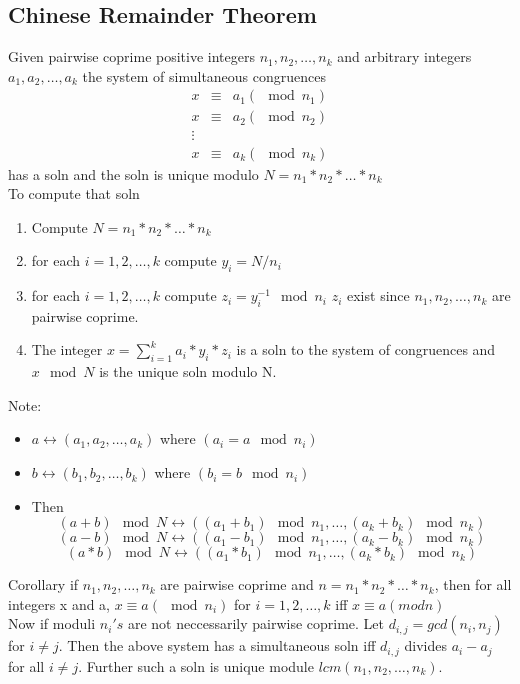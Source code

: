 \documentclass[8pt, a4paper, oneside, twocolumn]{extarticle}
\begin{document}
\subsection{Chinese Remainder Theorem}
Given pairwise coprime positive integers $n_1, n_2, \dots, n_k$ and arbitrary integers $a_1, a_2, \dots, a_k$ the system of simultaneous congruences \begin{eqnarray}
x & \equiv & a_1 (\mod n_1)\\
x & \equiv & a_2 (\mod n_2)\\
\vdots\\
x & \equiv & a_k (\mod n_k)
\end{eqnarray}
has a soln and the soln is unique modulo $N = n_1 * n_2 *\dots*n_k$
\\To compute that soln
\begin{enumerate}
    \item Compute $N = n_1 * n_2 * \dots * n_k$
    \item for each $i = 1, 2, \dots, k$ compute $y_i = N/n_i$
    \item for each $i = 1, 2, \dots, k$ compute $z_i = y_{i}^{-1} \mod n_i$ $z_i$ exist since $n_1, n_2, \dots, n_k$ are pairwise coprime.
    \item The integer $x = \sum_{i = 1}^k a_i * y_i * z_i$ is a soln to the system of congruences and $x \mod N$ is the unique soln modulo N.
\end{enumerate}
Note:
\begin{itemize}
    \item $a \leftrightarrow (a_1, a_2, \dots, a_k)$ where $(a_i = a \mod n_i)$
    \item $b \leftrightarrow (b_1, b_2, \dots, b_k)$ where $(b_i = b \mod n_i)$
    \item Then
    $$(a+b) \mod N \leftrightarrow ((a_1 + b_1) \mod n_1, \dots, (a_k + b_k) \mod n_k)$$ 
    $$(a-b) \mod N \leftrightarrow ((a_1 - b_1) \mod n_1, \dots, (a_k - b_k) \mod n_k)$$
    $$(a*b) \mod N \leftrightarrow ((a_1 * b_1) \mod n_1, \dots, (a_k * b_k) \mod n_k)$$
\end{itemize}
Corollary if $n_1, n_2, \dots, n_k$ are pairwise coprime and $n = n_1*n_2*\dots * n_k$, then for all integers x and a, $x \equiv a (\mod n_i)$ for $i = 1, 2, \dots, k$ iff $x \equiv a (mod n)$
\\Now if moduli $n_i's$ are not neccessarily pairwise coprime. Let $d_{i, j} = gcd(n_i, n_j)$ for $i \neq j$. Then the above system has a simultaneous soln iff $d_{i, j}$ divides $a_i - a_j$ for all $i \neq j$. Further such a soln is unique module $lcm(n_1, n_2, \dots, n_k)$.
\end{document}
